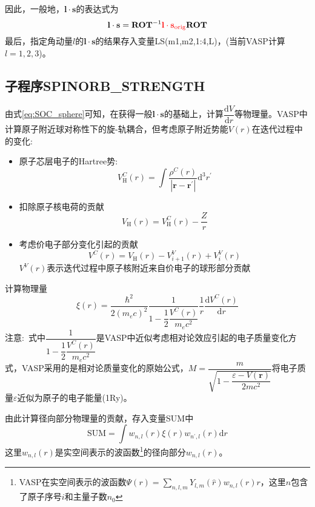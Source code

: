 \documentclass[10pt, oneside, a4paper]{article}      %
\begin{document}
因此，一般地，$\mathbf{l}\cdot\mathbf{s}$的表达式为
\begin{displaymath}
	\mathbf{l}\cdot\mathbf{s}= \mathbf{ROT}^{-1}\textcolor{red}{\mathbf{l}\cdot\mathbf{s}_{\mathrm{orig}}}\mathbf{ROT}
\end{displaymath}
最后，指定角动量$l$的$\mathbf{l}\cdot\mathbf{s}$的结果存入变量\textrm{LS(m1,m2,1:4,L)}，(当前\textrm{VASP}计算$l=1,2,3$)。

\subsection{子程序\bf{SPINORB\_STRENGTH}}
由式\eqref{eq:SOC_sphere}可知，在获得一般$\mathbf{l}\cdot\mathbf{s}$的基础上，计算$\dfrac{\mathrm{d}V}{\mathrm{d}r}$等物理量。\textrm{VASP}中计算原子附近球对称性下的旋-轨耦合，但考虑原子附近势能$V(r)$在迭代过程中的变化:
\begin{itemize}
	\item 原子芯层电子的\textrm{Hartree}势:
		\begin{displaymath}
			V_{\mathrm{H}}^C(r)=\int\dfrac{\rho^C(r)}{|\mathbf{r}-\mathbf{r^{\prime}}|}\mathrm{d}^3r^{\prime}
		\end{displaymath}
	\item 扣除原子核电荷的贡献
		\begin{displaymath}
			V_{\mathrm{H}}(r)=V_{\mathrm{H}}^C(r)-\dfrac{Z}r
		\end{displaymath}
	\item 考虑价电子部分变化引起的贡献
		\begin{displaymath}
			V^C(r)=V_{\mathrm{H}}(r)-V_{i+1}^{V}(r)+V_{i}^{V}(r)
		\end{displaymath}
$V^V(r)$表示迭代过程中原子核附近来自价电子的球形部分贡献
\end{itemize}
计算物理量
\begin{displaymath}
	\xi(r)=\dfrac{\hbar^2}{2(m_ec)^2}\dfrac1{1-\dfrac12\dfrac{V^C(r)}{m_ec^2}}\dfrac1r\dfrac{\mathrm{d}V^C(r)}{\mathrm{d}r}
\end{displaymath}
注意:~式中$\dfrac1{1-\dfrac12\dfrac{V^C(r)}{m_ec^2}}$是\textrm{VASP}中近似考虑相对论效应引起的电子质量变化方式，\textrm{VASP}采用的是相对论质量变化的原始公式，$M=\dfrac m{\sqrt{1-\dfrac{\varepsilon-V(\mathbf{r})}{2mc^2}}}$将电子质量$\varepsilon$近似为原子的电子能量(1\textrm{Ry})。

由此计算径向部分物理量的贡献，存入变量\textrm{SUM}中
\begin{displaymath}
	\mathrm{SUM}=\int w_{n,l}(r)\xi(r)w_{n^{\prime},l}(r)\mathrm{d}r
\end{displaymath}
这里$w_{n,l}(r)$是实空间表示的波函数\footnote{\textrm{VASP}在实空间表示的波函数$\Psi(r)=\sum\limits_{n,l,m}Y_{l,m}(\hat{r})w_{n,l}(r)r$，这里$n$包含了原子序号$i$和主量子数$n_0$}的径向部分$w_{n,l}(r)$。
\end{document}

